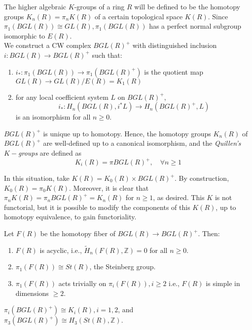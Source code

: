The higher algebraic $K$-groups of a ring $R$ will be defined to be the homotopy groups $K_n(R)=\pi_n K(R)$ of a certain topological space $K(R)$.
Since $\pi_1(B G L(R)) \cong G L(R), \pi_1(B G L(R))$ has a perfect normal subgroup isomorphic to $E(R)$.\\

We construct a CW complex $B G L(R)^{+}$ with distinguished inclusion $ i: B G L(R) \rightarrow B G L(R)^{+}$ such that:
\begin{enumerate}
    \item $i_*: \pi_1(B G L(R)) \longrightarrow \pi_1\left(B G L(R)^{+}\right)$ is the quotient map $G L(R) \longrightarrow G L(R) / E(R) = K_1(R)$
    \item for any local coefficient system $L$ on $B G L(R)^{+}$,
$$
i_*: H_n\left(B G L(R), i^* L\right) \longrightarrow H_n\left(B G L(R)^{+}, L\right)
$$
is an isomorphism for all $n \geq 0$.
\end{enumerate}

$B G L(R)^{+}$ is unique up to homotopy. Hence, the homotopy groups $K_n(R)$ of $B G L(R)^{+}$ are well-defined up to a canonical isomorphism, and the \textit{Quillen's $K-$groups} are defined as $$K_i (R) = \pi BGL(R)^+, \quad \forall n\geq 1 $$ 

In this situation, take $K(R) = K_0(R) \times B G L(R)^{+}$. By construction, $K_0(R)=\pi_0 K(R)$. Moreover, it is clear that $\pi_n K(R)=\pi_n B G L(R)^{+}=K_n(R)$ for $n \geq 1$, as desired. 
This $K$ is not functorial, but it is possible to modify the components of this $K(R)$, up to homotopy equivalence, to gain functoriality.


\begin{prop}
    Let $F(R)$ be the homotopy fiber of $B G L(R) \longrightarrow B G L(R)^{+}$. Then:
    \begin{enumerate}
        \item $F(R)$ is acyclic, i.e., $\tilde{H}_n(F(R), \mathbb{Z})=0$ for all $n \geq 0$.
        \item $\pi_1(F(R)) \cong S t(R)$, the Steinberg group.
        \item $\pi_1(F(R))$ acts trivially on $\pi_i(F(R)), i \geq 2$ i.e., $F(R)$ is simple in dimensions $\geq 2$.   
    \end{enumerate} 
\end{prop}


\begin{coro}
$\pi_i\left(B G L(R)^{+}\right) \cong K_i(R), i=1,2$, and
$
\pi_3\left(B G L(R)^{+}\right) \cong H_3(S t(R), \mathbb{Z}) .
$
\end{coro}


